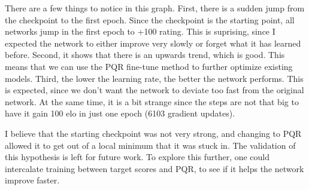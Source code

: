 There are a few things to notice in this graph. First, there is a sudden jump from the checkpoint to the first epoch. Since the checkpoint is the starting point, all networks jump in the first epoch to +100 rating. This is suprising, since I expected the network to either improve very slowly or forget what it has learned before.
Second, it shows that there is an upwards trend, which is good. This means that we can use the PQR fine-tune method to further optimize existing models.
Third, the lower the learning rate, the better the network performs. This is expected, since we don't want the network to deviate too fast from the original network. At the same time, it is a bit strange since the steps are not that big to have it gain 100 elo in just one epoch (6103 gradient updates).

I believe that the starting checkpoint was not very strong, and changing to PQR allowed it to get out of a local minimum that it was stuck in. The validation of this hypothesis is left for future work. To explore this further, one could intercalate training between target scores and PQR, to see if it helps the network improve faster.
